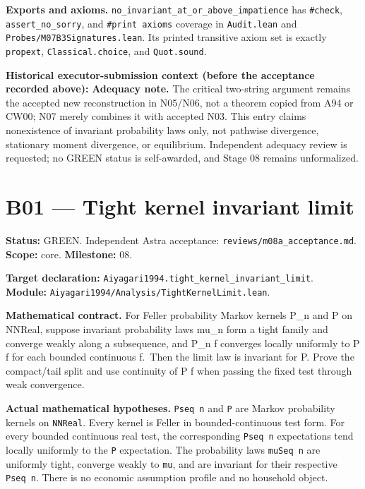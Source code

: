 \documentclass[
  11pt,
]{article}
\let\LedgerOriginalTexttt\texttt
\renewcommand{\texttt}[1]{{\small\LedgerOriginalTexttt{#1}}}
\begin{document}
\textbf{Exports and axioms.}
\texttt{no\_invariant\_at\_or\_above\_impatience} has \texttt{\#check},
\texttt{assert\_no\_sorry}, and \texttt{\#print\ axioms} coverage in
\texttt{Audit.lean} and \texttt{Probes/M07B3Signatures.lean}. Its
printed transitive axiom set is exactly \texttt{propext},
\texttt{Classical.choice}, and \texttt{Quot.sound}.

\textbf{Historical executor-submission context (before the acceptance
recorded above):} \textbf{Adequacy note.} The critical two-string
argument remains the accepted new reconstruction in N05/N06, not a
theorem copied from A94 or CW00; N07 merely combines it with accepted
N03. This entry claims nonexistence of invariant probability laws only,
not pathwise divergence, stationary moment divergence, or equilibrium.
Independent adequacy review is requested; no GREEN status is
self-awarded, and Stage 08 remains unformalized.

\section{B01 --- Tight kernel invariant
limit}\label{b01-tight-kernel-invariant-limit}

\textbf{Status:} GREEN. Independent Astra acceptance:
\texttt{reviews/m08a\_acceptance.md}. \textbf{Scope:} core.
\textbf{Milestone:} 08.

\textbf{Target declaration:}
\texttt{Aiyagari1994.tight\_kernel\_invariant\_limit}.\\
\textbf{Module:} \texttt{Aiyagari1994/Analysis/TightKernelLimit.lean}.

\textbf{Mathematical contract.} For Feller probability Markov kernels
P\_n and P on NNReal, suppose invariant probability laws mu\_n form a
tight family and converge weakly along a subsequence, and P\_n f
converges locally uniformly to P f for each bounded continuous f.~Then
the limit law is invariant for P. Prove the compact/tail split and use
continuity of P f when passing the fixed test through weak convergence.

\textbf{Actual mathematical hypotheses.} \texttt{Pseq\ n} and \texttt{P}
are Markov probability kernels on \texttt{NNReal}. Every kernel is
Feller in bounded-continuous test form. For every bounded continuous
real test, the corresponding \texttt{Pseq\ n} expectations tend locally
uniformly to the \texttt{P} expectation. The probability laws
\texttt{muSeq\ n} are uniformly tight, converge weakly to \texttt{mu},
and are invariant for their respective \texttt{Pseq\ n}. There is no
economic assumption profile and no household object.
\end{document}

